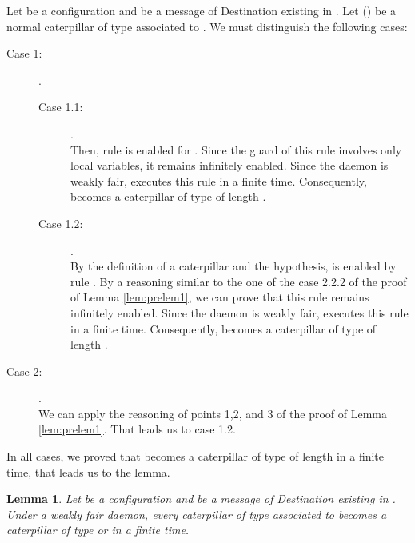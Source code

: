 \documentclass[11pt]{article}
\newtheorem{lemma}{Lemma}
\newenvironment{proof}{{\noindent\bf Proof. } }{{\hfill }}
\begin{document}
\begin{proof}
Let  be a configuration and  be a message of Destination  existing in . Let  () be a normal caterpillar of type  associated to . We must distinguish the following cases:

\begin{description}
\item [Case 1:] .

\begin{description}
\item [Case 1.1:] .\\
Then, rule  is enabled for . Since the guard of this rule involves only local variables, it remains infinitely enabled. Since the daemon is weakly fair,  executes this rule in a finite time. Consequently,  becomes a caterpillar of type  of length .
\item [Case 1.2:] .\\
By the definition of a caterpillar and the hypothesis,  is enabled by rule . By a reasoning similar to the one of the case 2.2.2 of the proof of Lemma \ref{lem:prelem1}, we can prove that this rule remains infinitely enabled. Since the daemon is weakly fair,  executes this rule in a finite time. Consequently,  becomes a caterpillar of type  of length .
\end{description}

\item [Case 2:] .\\
We can apply the reasoning of points 1,2, and 3 of the proof of Lemma \ref{lem:prelem1}. That leads us to case 1.2. 
\end{description}

In all cases, we proved that  becomes a caterpillar of type  of length  in a finite time, that leads us to the lemma.
\end{proof}

\begin{lemma} \label{lem:prelem4}
Let  be a configuration and  be a message of Destination  existing in . Under a weakly fair daemon, every caterpillar of type  associated to  becomes a caterpillar of type  or  in a finite time.
\end{lemma}
\end{document}
